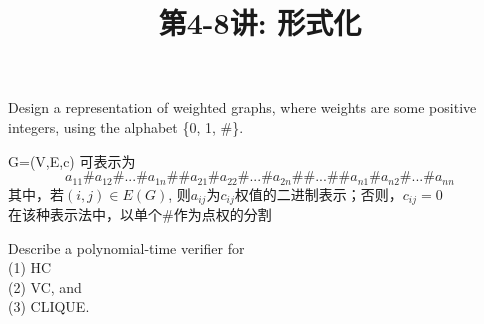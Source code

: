 \documentclass[a4paper, justified]{tufte-handout}
\title{第4-8讲: 形式化}
\date{\zhtoday} %
\begin{document}
\maketitle
\noplagiarism %
\begin{abstract}
\end{abstract}
\beginrequired

\begin{problem}[JH  2.3.1.8]
Design a representation of weighted graphs, where weights are some positive integers,
using the alphabet \{0, 1, \#\}.
\end{problem}

\begin{solution}
G=(V,E,c) 可表示为
\[
a_{11}\#a_{12}\#...\#a_{1n}\#\#a_{21}\#a_{22}\#...\#a_{2n}\#\#...\#\#a_{n1}\#a_{n2}\#...\#a_{nn}
\]
其中，若$(i,j) \in E(G)$, 则$a_{ij}$为$c_{ij}$权值的二进制表示；否则，$c_{ij}=0$\\
在该种表示法中，以单个\#作为点权的分割
\end{solution}



\begin{problem}[JH  2.3.3.8]
Describe a polynomial-time verifier for\\
(1) HC\\
(2) VC, and\\
(3) CLIQUE.
\end{problem}
\end{document}
